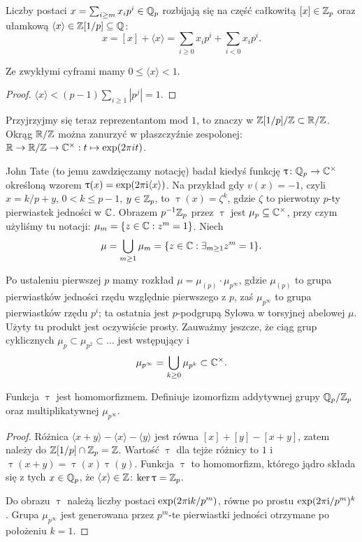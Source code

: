 \begin{definicja} \label{cptmetal}
	Liczby  postaci $x = \sum_{i \ge m} x_i p^i \in \mathbb Q_p$ rozbijają się na część całkowitą $[x] \in \mathbb Z_p$ oraz ułamkową $\langle x \rangle \in \mathbb Z[1/p] \subseteq \mathbb Q$:
	\[
		x = [x] + \langle x \rangle = \sum_{i \ge 0} x_i p^i + \sum_{i < 0} x_i p^i.
	\]
\end{definicja}

\begin{fakt}
	Ze zwykłymi cyframi mamy $0 \le \langle x \rangle < 1$.
\end{fakt}

\begin{proof}
	$\langle x \rangle < (p-1) \sum_{i \ge 1} |p^j| = 1$.
\end{proof}

Przyjrzyjmy się teraz reprezentantom mod $1$, to znaczy w $\mathbb Z[1/p] / \mathbb Z \subset \mathbb R / \mathbb Z$.
Okrąg $\mathbb R / \mathbb Z$ można zanurzyć w płaszczyźnie zespolonej: $\mathbb R \to \mathbb R / \mathbb Z \to \mathbb C^\times : t \mapsto \exp (2 \pi i t)$.

John Tate (to jemu zawdzięczamy notację) badał kiedyś funkcję $\uptau \colon \mathbb Q_p \to \mathbb C^\times$ określoną wzorem $\uptau(x) = \exp(2 \pi \textrm{i} \langle x \rangle)$.
Na przykład gdy $v(x) = -1$, czyli $x = k/p + y$, $0 < k \le p-1$, $y \in \mathbb Z_p$, to $\uptau(x) = \zeta^k$, gdzie $\zeta$ to pierwotny $p$-ty pierwiastek jedności w $\mathbb C$.
Obrazem $p^{-1} \mathbb Z_p$ przez $\uptau$ jest $\mu_p \subseteq \mathbb C^\times$, przy czym użyliśmy tu notacji: $\mu_m = \{z \in \mathbb C : z^m = 1\}$.
Niech
\[
	\mu = \bigcup_{m \ge 1} \mu_m = \{z \in \mathbb C : \exists_{m \ge 1} z^m = 1\}.
\]

Po ustaleniu pierwszej $p$ mamy rozkład $\mu = \mu_{(p)} \cdot \mu_{p^\infty}$, gdzie $\mu_{(p)}$ to grupa pierwiastków jedności rzędu względnie pierwszego z $p$, zaś $\mu_{p^\infty}$ to grupa pierwiastków rzędu $p^i$; ta ostatnia jest $p$-podgrupą Sylowa w torsyjnej abelowej $\mu$.
Użyty tu produkt jest oczywiście prosty.
Zauważmy jeszcze, że ciąg grup cyklicznych $\mu_p \subset \mu_{p^2} \subset \ldots$ jest wstępujący i
\[
	\mu_{p^\infty} = \bigcup_{k \ge 0} \mu_{p^k} \subset \mathbb C^\times.
\]

\begin{fakt}
	Funkcja $\uptau$ jest homomorfizmem.
	Definiuje izomorfizm addytywnej grupy $\mathbb Q_p/\mathbb Z_p$ oraz multiplikatywnej $\mu_{p^\infty}$.
\end{fakt}

\begin{proof}
	Różnica $\langle x+y \rangle - \langle x \rangle - \langle y \rangle$ jest równa $[x]+[y] - [x+y]$, zatem należy do $\mathbb Z[1/p] \cap \mathbb Z_p = \mathbb Z$.
	Wartość $\uptau$ dla tejże różnicy to $1$ i $\uptau(x+y) = \uptau(x) \uptau(y)$.
	Funkcja $\uptau$ to homomorfizm, którego jądro składa się z tych $x \in \mathbb Q_p$, że $\langle x \rangle \in \mathbb Z$: $\ker \uptau = \mathbb Z_p$.

	Do obrazu $\uptau$ należą liczby postaci $\exp(2\pi \textrm{i} k/p^m)$, równe po prostu $\exp(2 \pi \textrm{i} / p^m)^k$.
	Grupa $\mu_{p^\infty}$ jest generowana przez $p^m$-te pierwiastki jedności otrzymane po położeniu $k = 1$.
\end{proof}

